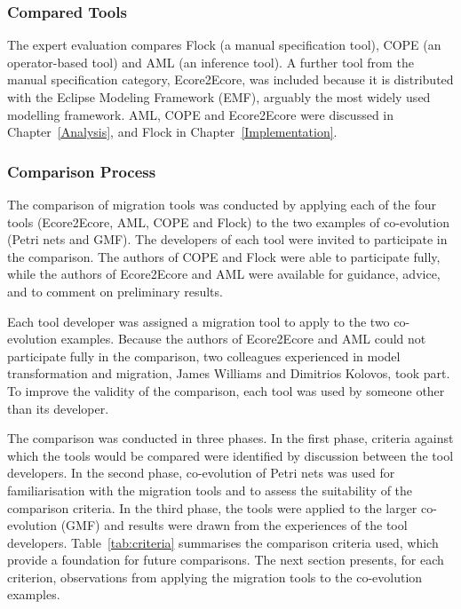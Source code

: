 \subsubsection{Compared Tools}
\label{subsec:method_tools}
The expert evaluation compares Flock (a manual specification tool), COPE (an operator-based tool) and AML (an inference tool). A further tool from the manual specification category, Ecore2Ecore, was included because it is distributed with the Eclipse Modeling Framework (EMF), arguably the most widely used modelling framework. AML, COPE and Ecore2Ecore were discussed in Chapter~\ref{Analysis}, and Flock in Chapter~\ref{Implementation}.


\subsubsection{Comparison Process}
\label{subsec:method_process}
The comparison of migration tools was conducted by applying each of the four tools (Ecore2Ecore, AML, COPE and Flock) to the two examples of co-evolution (Petri nets and GMF). The developers of each tool were invited to participate in the comparison. The authors of COPE and Flock were able to participate fully, while the authors of Ecore2Ecore and AML were available for guidance, advice, and to comment on preliminary results.

Each tool developer was assigned a migration tool to apply to the two co-evolution examples. Because the authors of Ecore2Ecore and AML could not participate fully in the comparison, two colleagues experienced in model transformation and migration, James Williams and Dimitrios Kolovos, took part. To improve the validity of the comparison, each tool was used by someone other than its developer.

The comparison was conducted in three phases. In the first phase, criteria against which the tools would be compared were identified by discussion between the tool developers. In the second phase, co-evolution of Petri nets was used for familiarisation with the migration tools and to assess the suitability of the comparison criteria. In the third phase, the tools were applied to the larger co-evolution (GMF) and results were drawn from the experiences of the tool developers. Table~\ref{tab:criteria} summarises the comparison criteria used, which provide a foundation for future comparisons. The next section presents, for each criterion, observations from applying the migration tools to the co-evolution examples.

